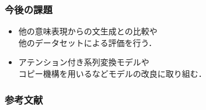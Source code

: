 \documentclass[dvipdfmx,cjk]{beamer}
\begin{document}
\begin{frame}
\frametitle{今後の課題}
\begin{itemize}
\item 他の意味表現からの文生成との比較や\\他のデータセットによる評価を行う．
\item アテンション付き系列変換モデルや\\コピー機構を用いるなどモデルの改良に取り組む．
\end{itemize}

\end{frame}

\begin{frame}
\frametitle{参考文献}

\end{frame}
\end{document}
